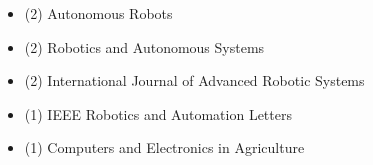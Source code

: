 \begin{itemize}
	\item (2) Autonomous Robots
	\item (2) Robotics and Autonomous Systems
	\item (2) International Journal of Advanced Robotic Systems
	\item (1) IEEE Robotics and Automation Letters
	\item (1) Computers and Electronics in Agriculture
\end{itemize}